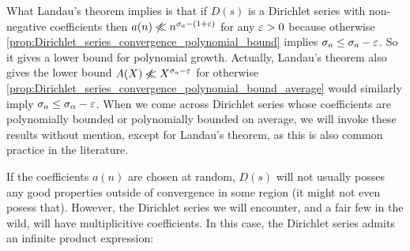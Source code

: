       What Landau's theorem implies is that if $D(s)$ is a Dirichlet series with non-negative coefficients then $a(n) \not\ll n^{\sigma_{a}-(1+\varepsilon)}$ for any $\varepsilon > 0$ because otherwise \cref{prop:Dirichlet_series_convergence_polynomial_bound} implies $\sigma_{a} \le \sigma_{a}-\varepsilon$. So it gives a lower bound for polynomial growth. Actually, Landau's theorem also gives the lower bound $A(X) \not\ll X^{\sigma_{a}-\varepsilon}$ for otherwise \cref{prop:Dirichlet_series_convergence_polynomial_bound_average} would similarly imply $\sigma_{a} \le \sigma_{\alpha}-\varepsilon$. When we come across Dirichlet series whose coefficients are polynomially bounded or polynomially bounded on average, we will invoke these results without mention, except for Landau's theorem, as this is also common practice in the literature.

      If the coefficients $a(n)$ are chosen at random, $D(s)$ will not usually posses any good properties outside of convergence in some region (it might not even posess that). However, the Dirichlet series we will encounter, and a fair few in the wild, will have multiplicitive coefficients. In this case, the Dirichlet series admits an infinite product expression:

